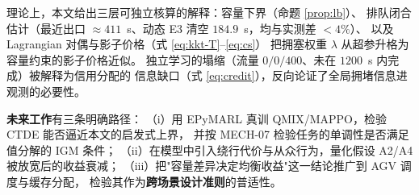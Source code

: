 理论上，本文给出三层可独立核算的解释：容量下界（命题 \ref{prop:lb}）、
排队闭合估计（最近出口 $\approx411$~s、动态 E3 清空 $184.9$~s，均与实测差 $<4\%$）、
以及 Lagrangian 对偶与影子价格（式 \eqref{eq:kkt-T}--\eqref{eq:cs}）
把拥塞权重 $\lambda$ 从超参升格为容量约束的影子价格近似。
独立学习的塌缩（流量 $0/0/400$、未在 $1200$~s 内完成）被解释为信用分配的
信息缺口（式 \eqref{eq:credit}），反向论证了全局拥堵信息进观测的必要性。

\textbf{未来工作}有三条明确路径：
（i）用 EPyMARL 真训 QMIX/MAPPO，检验 CTDE 能否逼近本文的启发式上界，
并按 MECH-07 检验任务的单调性是否满足值分解的 IGM 条件；
（ii）在模型中引入绕行代价与从众行为，量化假设 A2/A4 被放宽后的收益衰减；
（iii）把"容量差异决定均衡收益"这一结论推广到 AGV 调度与缓存分配，
检验其作为\textbf{跨场景设计准则}的普适性。
